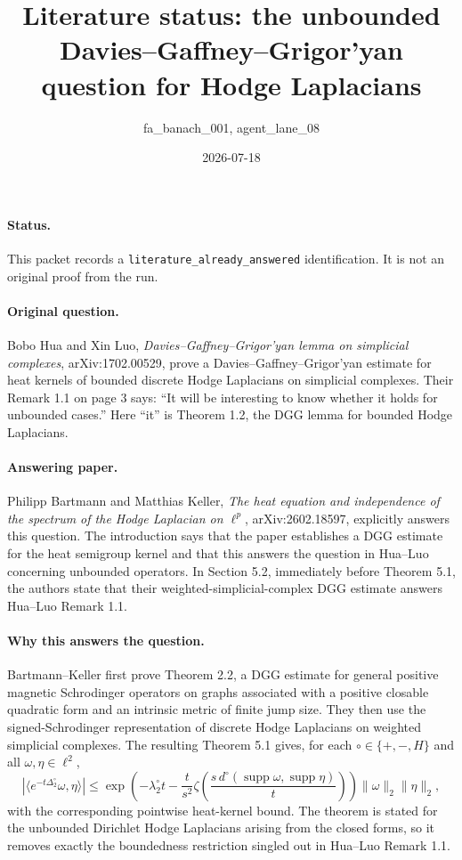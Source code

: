 \documentclass[11pt]{article}
\title{Literature status: the unbounded Davies--Gaffney--Grigor'yan question for Hodge Laplacians}
\author{fa\_banach\_001, agent\_lane\_08}
\date{2026-07-18}
\begin{document}
\maketitle

\paragraph{Status.}
This packet records a \texttt{literature\_already\_answered} identification.
It is not an original proof from the run.

\paragraph{Original question.}
Bobo Hua and Xin Luo, \emph{Davies--Gaffney--Grigor'yan lemma on simplicial complexes},
arXiv:1702.00529, prove a Davies--Gaffney--Grigor'yan estimate for heat kernels of
bounded discrete Hodge Laplacians on simplicial complexes.  Their Remark 1.1
on page 3 says: ``It will be interesting to know whether it holds for unbounded
cases.''  Here ``it'' is Theorem 1.2, the DGG lemma for bounded Hodge
Laplacians.

\paragraph{Answering paper.}
Philipp Bartmann and Matthias Keller, \emph{The heat equation and independence
of the spectrum of the Hodge Laplacian on $\ell^p$}, arXiv:2602.18597, explicitly
answers this question.  The introduction says that the paper establishes a DGG
estimate for the heat semigroup kernel and that this answers the question in
Hua--Luo concerning unbounded operators.  In Section 5.2, immediately before
Theorem 5.1, the authors state that their weighted-simplicial-complex DGG
estimate answers Hua--Luo Remark 1.1.

\paragraph{Why this answers the question.}
Bartmann--Keller first prove Theorem 2.2, a DGG estimate for general positive
magnetic Schrodinger operators on graphs associated with a positive closable
quadratic form and an intrinsic metric of finite jump size.  They then use the
signed-Schrodinger representation of discrete Hodge Laplacians on weighted
simplicial complexes.  The resulting Theorem 5.1 gives, for each
$\circ\in\{+,-,H\}$ and all $\omega,\eta\in\ell^2$,
\[
  |\langle e^{-t\Delta^\circ_2}\omega,\eta\rangle|
  \leq
  \exp\!\left(
    -\lambda^\circ_2 t
    -\frac{t}{s^2}\zeta\!\left(\frac{s\,d^\circ(\operatorname{supp}\omega,
    \operatorname{supp}\eta)}{t}\right)
  \right)\|\omega\|_2\|\eta\|_2,
\]
with the corresponding pointwise heat-kernel bound.  The theorem is stated for
the unbounded Dirichlet Hodge Laplacians arising from the closed forms, so it
removes exactly the boundedness restriction singled out in Hua--Luo Remark 1.1.
\end{document}
